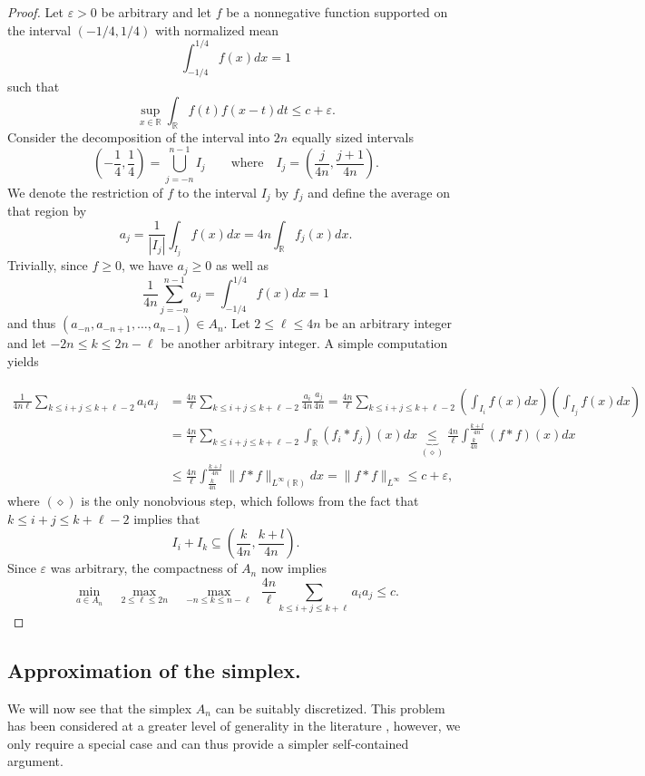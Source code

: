 \documentclass[10pt]{amsart}
\begin{document}
\begin{proof} Let $\varepsilon > 0$ be arbitrary and let $f$ be a 
nonnegative function supported on the interval $(-1/4, 1/4)$ with normalized mean 
$$\int_{-1/4}^{1/4}{f(x)dx} = 1$$
such that
$$ \sup_{x \in \mathbb{R}}{\int_{\mathbb{R}}{f(t)f(x-t)dt}} \leq c + \varepsilon.$$
Consider the decomposition of the interval into $2n$ equally
sized intervals
$$ \left( -\frac{1}{4}, \frac{1}{4}\right) = \bigcup_{j=-n}^{n-1}{I_j} \qquad \mbox{where}\quad
I_j = \left(\frac{j}{4n},\frac{j+1}{4n}\right).$$
We denote the restriction of $f$ to the interval $I_j$ by $f_j$ and define the average on that region by
$$ a_{j} = \frac{1}{|I_j|}\int_{I_j}{f(x)dx} = 4n\int_{\mathbb{R}}{f_j(x)dx}.$$
Trivially, since $f \geq 0$, we have $a_{j} \geq 0$ as well as
$$ \frac{1}{4n}\sum_{j=-n}^{n-1}{a_j} = \int_{-1/4}^{1/4}{f(x)dx} = 1$$
and thus $(a_{-n}, a_{-n+1}, \dots, a_{n-1}) \in A_n$. Let $2 \leq \ell \leq 4n$ be an arbitrary integer and let $-2n \leq k \leq 2n-\ell$ be another arbitrary integer. A simple computation yields

\begin{align*}
\frac{1}{4n\ell}\sum_{k \leq i+j \leq k +\ell -2}{a_i a_j} &=
\frac{4n}{\ell}\sum_{k \leq i+j \leq k +\ell -2}{\frac{a_i}{4n} \frac{a_j}{4n}} = \frac{4n}{\ell}\sum_{k \leq i+j \leq k +\ell -2}{\left(\int_{I_i}{f(x)dx}\right)\left( \int_{I_j}{f(x)dx}\right)} \\
&=\frac{4n}{\ell}\sum_{k \leq i+j \leq k +\ell -2}{\int_{\mathbb{R}}{(f_i*f_j)(x)dx}} \underbrace{\leq}_{(\diamond)} \frac{4n}{\ell}\int_{\frac{k}{4n}}^{\frac{k+l}{4n}}{(f*f)(x)dx} \\
&\leq \frac{4n}{\ell}\int_{\frac{k}{4n}}^{\frac{k+l}{4n}}{\|f*f\|_{L^{\infty}(\mathbb{R})}dx} = \|f*f\|_{L^{\infty}} \leq c+\varepsilon,
\end{align*}
where $(\diamond)$ is the only nonobvious step, which follows from the fact that $k \leq i+j \leq k +\ell -2$
implies that
$$ I_{i} + I_{k} \subseteq \left( \frac{k}{4n}, \frac{k+l}{4n} \right).$$
Since $\varepsilon$ was arbitrary, the compactness of $A_n$ now implies
$$\min_{a \in A_n} ~~~~\max_{2 \leq \ell \leq 2n} ~~~~\max_{-n \leq k \leq n-\ell}~~
\frac{4n}{\ell}\sum_{k \leq i+j \leq k +\ell}{a_i a_j} \leq c.$$
\end{proof}

\subsection{Approximation of the simplex.} We will now see that the simplex $A_n$ can be suitably discretized. This problem has been
considered at a greater level of generality in the literature \cite{bonze}, however, we only require a special case
and can thus provide a simpler self-contained argument.
\end{document}

